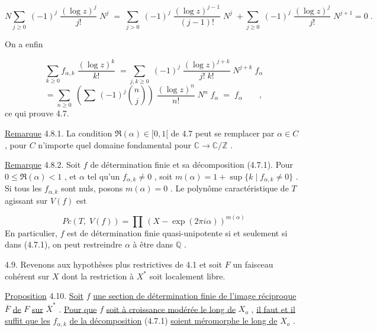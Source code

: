 \begin{equation*}
N \sum_{j \geq 0} \; (-1)^j \; \frac{(\log z)^j}{j!} \; N^j \; = \; \sum_{j > 0} \; (-1)^j \; \frac{(\log z)^{j-1}}{(j-1)!} \; N^j \; + \sum_{j \geq 0} \; (-1)^j \; \frac{(\log z)^j}{j!} \; N^{j+1} = 0 \; .
\end{equation*}


On a enfin

\begin{equation*}
\sum_{k \geq 0} f_{\alpha,k} \; \frac{(\log z)^k}{k!} \; = \sum_{j,k \geq 0} \; (-1)^j \; \frac{(\log z)^{j+k}}{j! \; k!} \; N^{j+k} \; f_\alpha
\end{equation*}
\begin{equation*}
= \sum_{n \geq 0} \; (\sum \, (-1)^j \binom{n}{j}) \; \frac{(\log z)^n}{n!} \; N^n \; f_\alpha \; = \; f_\alpha \qquad ,
\end{equation*}
ce qui prouve 4.7.

\underline{Remarque} 4.8.1. La condition $\Re(\alpha) \in [0, 1[$ de 4.7 peut se remplacer par $\alpha \in C$ , pour $C$ n'importe quel domaine fondamental pour $\mathbb{C} \to \mathbb{C}/\mathbb{Z}$ .

\underline{Remarque} 4.8.2. Soit $f$ de détermination finie et sa décomposition (4.7.1). Pour $0 \leq \Re(\alpha) < 1$ , et $\alpha$ tel qu'un $f_{\alpha,k} \neq 0$ , soit $m(\alpha) = 1 + \sup \{k \mid f_{\alpha,k} \neq 0\}$ . Si tous les $f_{\alpha,k}$ sont nuls, posons $m(\alpha) = 0$ . Le polynôme caractéristique de $T$ agissant sur $V(f)$ est

\begin{equation*}
Pc(T, \; V(f)) = \prod \, (X - \exp(2\pi i \alpha))^{m(\alpha)}
\end{equation*}
En particulier, $f$ est de détermination finie quasi-unipotente si et seulement si dans (4.7.1), on peut restreindre $\alpha$ à être dans $\mathbb{Q}$ .

4.9. Revenons aux hypothèses plus restrictives de 4.1 et soit $F$ un faisceau cohérent sur $X$ dont la restriction à $X^*$ soit localement libre.

\underline{Proposition} 4.10. \underline{Soit} $f$ \underline{une section de détermination finie de l'image réciproque} $\overline{F}$ \underline{de} $F$ \underline{sur} $\overline{X}^*$ . \underline{Pour que} $f$ \underline{soit à croissance modérée le long de} $X_o$ , \underline{il faut et il suffit que les} $f_{\alpha,k}$ \underline{de la décomposition} (4.7.1) \underline{soient méromorphe le long de} $X_o$ .

